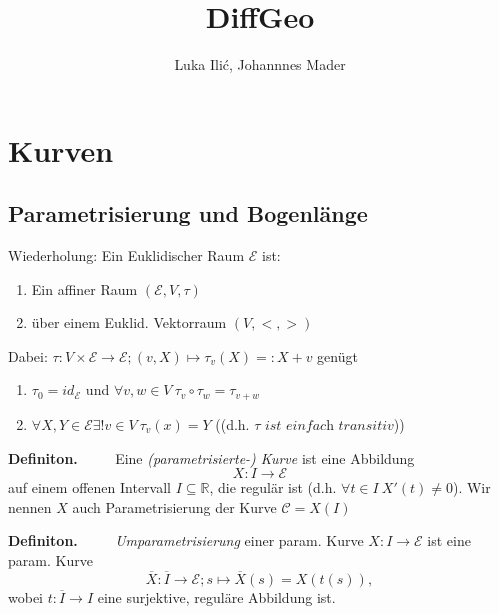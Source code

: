 \documentclass[a4paper,oneside,11pt,DIV=12,parskip=half]{scrartcl}
\title{DiffGeo}
\author{ Luka Ili\'{c}, Johannnes Mader}
\newcommand{\R}{\mathbb R}
\newenvironment{definition}{\textbf{Definiton.} ~~~~}{}
\begin{document}
	
	\maketitle
	
	\pagebreak
	
	\tableofcontents
	
	\pagebreak
	
\section{Kurven}
\subsection{Parametrisierung und Bogenlänge}

Wiederholung: Ein Euklidischer Raum $\mathcal{E}$ ist:
\begin{enumerate}
	\item Ein affiner Raum $(\mathcal{E},V,\tau)$ 
	\item über einem Euklid. Vektorraum $(V,<,>)$ 
\end{enumerate}

	Dabei: $\tau: V\times \mathcal{E} \rightarrow \mathcal{E}; (v,X) \mapsto \tau_v(X)=:X+v$ genügt
	\begin{enumerate}
		\item $\tau_0 = id_{\mathcal{E}}$ und $\forall v,w \in V ~ \tau_v \circ \tau_w = \tau_{v+w}$
		\item $\forall X,Y \in \mathcal{E} \exists! v \in V ~ \tau_v(x) = Y$ ((d.h. $\tau  \textit{ ist einfach transitiv}$))
	\end{enumerate}
	
	
\begin{definition}
	Eine \textit{(parametrisierte-) Kurve} ist eine Abbildung \[X: I \rightarrow \mathcal{E}\] auf einem offenen Intervall $I \subseteq \R$, die regulär ist (d.h. $\forall t \in I ~ X'(t) \not = 0$).
	Wir nennen $X$ auch Parametrisierung der Kurve $\mathcal{C} = X(I)$ 
\end{definition}

\begin{definition}
	\textit{Umparametrisierung} einer param. Kurve $X: I \rightarrow \mathcal{E}$ ist eine param. Kurve
	\[\overline{X}: \overline{I} \rightarrow \mathcal{E}; s \mapsto \overline{X}(s)=X(t(s)),\]
	wobei $t: \overline{I} \rightarrow I$ eine surjektive, reguläre Abbildung ist.

\end{definition}
\end{document}
